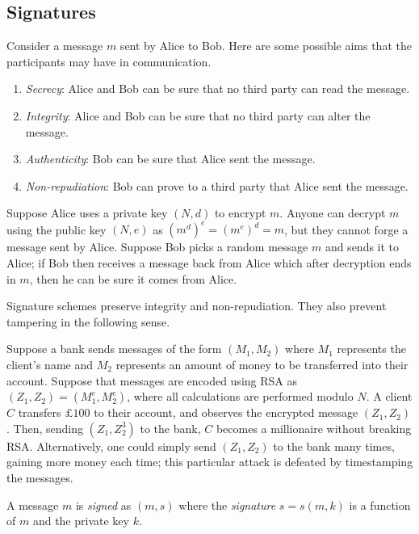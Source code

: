 \subsection{Signatures}
Consider a message \( m \) sent by Alice to Bob.
Here are some possible aims that the participants may have in communication.
\begin{enumerate}
    \item \emph{Secrecy}: Alice and Bob can be sure that no third party can read the message.
    \item \emph{Integrity}: Alice and Bob can be sure that no third party can alter the message.
    \item \emph{Authenticity}: Bob can be sure that Alice sent the message.
    \item \emph{Non-repudiation}: Bob can prove to a third party that Alice sent the message.
\end{enumerate}
\begin{example}
    Suppose Alice uses a private key \( (N, d) \) to encrypt \( m \).
    Anyone can decrypt \( m \) using the public key \( (N, e) \) as \( (m^d)^e = (m^e)^d = m \), but they cannot forge a message sent by Alice.
    Suppose Bob picks a random message \( m \) and sends it to Alice; if Bob then receives a message back from Alice which after decryption ends in \( m \), then he can be sure it comes from Alice.
\end{example}
Signature schemes preserve integrity and non-repudiation.
They also prevent tampering in the following sense.
\begin{example}
    Suppose a bank sends messages of the form \( (M_1, M_2) \) where \( M_1 \) represents the client's name and \( M_2 \) represents an amount of money to be transferred into their account.
    Suppose that messages are encoded using RSA as \( (Z_1, Z_2) = (M_1^e, M_2^e) \), where all calculations are performed modulo \( N \).
    A client \( C \) transfers \( \pounds 100 \) to their account, and observes the encrypted message \( (Z_1, Z_2) \).
    Then, sending \( (Z_1, Z_2^3) \) to the bank, \( C \) becomes a millionaire without breaking RSA.
    Alternatively, one could simply send \( (Z_1, Z_2) \) to the bank many times, gaining more money each time; this particular attack is defeated by timestamping the messages.
\end{example}
\begin{definition}
    A message \( m \) is \emph{signed} as \( (m, s) \) where the \emph{signature} \( s = s(m,k) \) is a function of \( m \) and the private key \( k \).
\end{definition}
